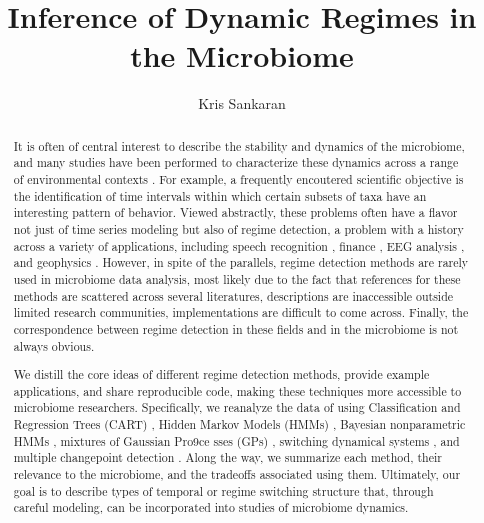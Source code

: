 \documentclass{article}
\title{Inference of Dynamic Regimes in the Microbiome}
\author{Kris Sankaran}
\begin{document}
\maketitle


\begin{abstract}
It is often of central interest to describe the stability and dynamics of the
microbiome, and many studies have been performed to characterize these dynamics
across a range of environmental contexts \citep{costello2012application,
  stein2013ecological, faust2015metagenomics}. For example, a frequently
encoutered scientific objective is the identification of time intervals within
which certain subsets of taxa have an interesting pattern of behavior. Viewed
abstractly, these problems often have a flavor not just of time series modeling
but also of regime detection, a problem with a history across a variety of
applications, including speech recognition \citep{fox2011sticky}, finance
\citep{lee2009optimal}, EEG analysis \citep{camilleri2014automatic}, and
geophysics \citep{weatherley2002relationship}. However, in spite of the
parallels, regime detection methods are rarely used in microbiome data analysis,
most likely due to the fact that references for these methods are scattered
across several literatures, descriptions are inaccessible outside limited
research communities, implementations are difficult to come across. Finally, the
correspondence between regime detection in these fields and in the microbiome is
not always obvious.

We distill the core ideas of different regime detection methods, provide example
applications, and share reproducible code, making these techniques more
accessible to microbiome researchers. Specifically, we reanalyze the data of
\citep{dethlefsen2011incomplete} using Classification and Regression Trees
(CART) \citep{breiman1984classification}, Hidden Markov Models (HMMs)
\citep{rabiner1986introduction}, Bayesian nonparametric HMMs
\citep{teh2010hierarchical}, mixtures of Gaussian Pro9ce
sses (GPs)
\citep{rasmussen2002infinite}, switching dynamical systems
\citep{fox2009sharing}, and multiple changepoint detection
\citep{fan2015empirical}. Along the way, we summarize each method, their
relevance to the microbiome, and the tradeoffs associated using them.
Ultimately, our goal is to describe types of temporal or regime switching
structure that, through careful modeling, can be incorporated into studies of
microbiome dynamics.
\end{abstract}
\end{document}
